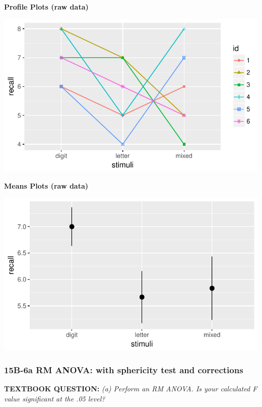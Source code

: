 \documentclass[]{article}
\begin{document}
\textbf{Profile Plots (raw data)}

\begin{center}\includegraphics{Unit_5_assignment_KEY_R__spr18__files/figure-latex/unnamed-chunk-23-1} \end{center}

\textbf{Means Plots (raw data)}

\begin{center}\includegraphics{Unit_5_assignment_KEY_R__spr18__files/figure-latex/unnamed-chunk-24-1} \end{center}

\clearpage

\subsubsection{15B-6a RM ANOVA: with sphericity test and
corrections}\label{b-6a-rm-anova-with-sphericity-test-and-corrections}

\textbf{TEXTBOOK QUESTION:} \emph{(a) Perform an RM ANOVA. Is your
calculated F value significant at the .05 level?}
\end{document}
